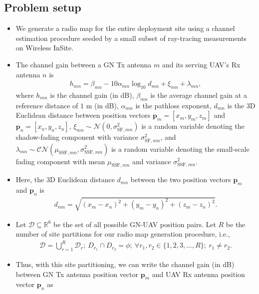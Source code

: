 \documentclass{article}
\begin{document}
\subsection{Problem setup}
\begin{itemize}
    \item We generate a radio map for the entire deployment site using a channel estimation procedure seeded by a small subset of ray-tracing measurements on Wireless InSite.
    \item The channel gain between a GN Tx antenna $m$ and its serving UAV's Rx antenna $n$ is
    \begin{align*}
        h_{mn}{=}\beta_{mn}{-}10\alpha_{mn}\log_{10}d_{mn}{+}\xi_{mn}{+}\lambda_{mn},
    \end{align*}
    where $h_{mn}$ is the channel gain (in dB), $\beta_{mn}$ is the average channel gain at a reference distance of $1$ m (in dB), $\alpha_{mn}$ is the pathloss exponent, $d_{mn}$ is the $3$D Euclidean distance between position vectors $\mathbf{p}_{m}{=}[x_{m},y_{m},z_{m}]$ and $\mathbf{p}_{n}{=}[x_{n},y_{n},z_{n}]$, $\xi_{mn}{\sim}\mathcal{N}\left(0,\sigma_{\mathrm{SF},mn}^{2}\right)$ is a random variable denoting the shadow-fading component with variance $\sigma_{\mathrm{SF},mn}^{2}$, and $\lambda_{mn}{\sim}\mathcal{CN}\left(\mu_{\mathrm{SSF},mn},\sigma_{\mathrm{SSF},mn}^{2}\right)$ is a random variable denoting the small-scale fading component with mean $\mu_{\mathrm{SSF},mn}$ and variance $\sigma_{\mathrm{SSF},mn}^{2}$.
    \item Here, the $3$D Euclidean distance $d_{mn}$ between the two position vectors $\mathbf{p}_{m}$ and $\mathbf{p}_{n}$ is
    \begin{align}\label{Distance}
        d_{mn}{=}\sqrt{(x_{m}{-}x_{n})^{2}{+}(y_{m}{-}y_{n})^{2}{+}(z_{m}{-}z_{n})^{2}}.
    \end{align}
    \item Let $\mathcal{D}{\subseteq}\mathbb{R}^{6}$ be the set of all possible GN-UAV position pairs. Let $R$ be the number of site partitions for our radio map generation procedure, i.e.,
    \begin{align}
        \mathcal{D}{=}\bigcup_{r{=}1}^{R}\mathcal{D}_{r};\ D_{r_{1}}{\cap}D_{r_{2}}{=}\phi;\ {\forall}r_{1},r_{2}{\in}\{1,2,3,{\dots},R\};\ r_{1}{\neq}r_{2}.
    \end{align}
    \item Thus, with this site partitioning, we can write the channel gain (in dB) between GN Tx antenna position vector $\mathbf{p}_{m}$ and UAV Rx antenna position vector $\mathbf{p}_{n}$ as

\end{itemize}
\end{document}

